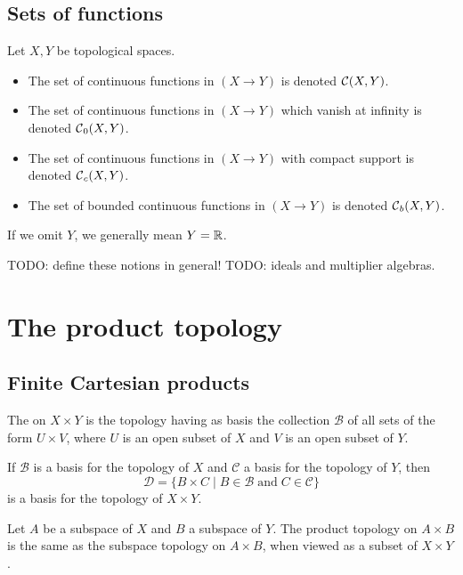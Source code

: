 \subsection{Sets of functions}
\begin{definition}
Let $X, Y$ be topological spaces.
\begin{itemize}
\item The set of continuous functions in $(X\to Y)$ is denoted $\operatorname{\mathcal{C}}(X, Y)$.
\item The set of continuous functions in $(X\to Y)$ which vanish at infinity is denoted $\operatorname{\mathcal{C}}_0(X, Y)$.
\item The set of continuous functions in $(X\to Y)$ with compact support is denoted $\operatorname{\mathcal{C}}_c(X, Y)$.
\item The set of bounded continuous functions in $(X\to Y)$ is denoted $\operatorname{\mathcal{C}}_b(X, Y)$.
\end{itemize}
If we omit $Y$, we generally mean $Y = \mathbb{R}$.
\end{definition}

TODO: define these notions in general!
TODO: ideals and multiplier algebras.


\section{The product topology}
\subsection{Finite Cartesian products}
\begin{definition}
The  on $X\times Y$ is the topology having as basis the collection $\mathcal{B}$ of all sets of the form $U\times V$, where $U$ is an open subset of $X$ and $V$ is an open subset of $Y$.
\end{definition}
\begin{lemma} \label{basisFiniteProductTopology}
If $\mathcal{B}$ is a basis for the topology of $X$ and $\mathcal{C}$ a basis for the topology of $Y$, then
\[ \mathcal{D} = \{ B\times C\;|\; B\in \mathcal{B}\;\text{and}\; C\in \mathcal{C} \} \]
is a basis for the topology of $X\times Y$.
\end{lemma}
\begin{proposition}
Let $A$ be a subspace of $X$ and $B$ a subspace of $Y$. The product topology on $A\times B$ is the same as the subspace topology on $A\times B$, when viewed as a subset of $X\times Y$.
\end{proposition}

